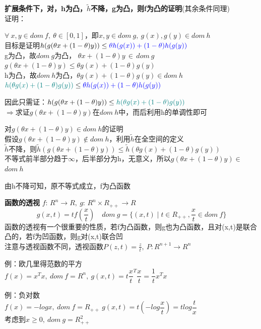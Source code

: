 \documentclass[11pt]{ctexart}         %
\newcommand{\premise}[1][dom\ f]{\forall\ x,y\in #1,\ \theta\in [0,1]}
\newcommand{\linearcombine}[2]{\theta #1+(1-\theta)#2}
\newcommand{\ii}{\,\in\,}
\newcommand{\dom}[1]{$dom\ #1$}
\newcommand{\rl}[2][R]{#1_{#2}} %
\newcommand{\rls}[3][R]{#1_{#2}^{#3}} %
\newcommand{\trans}[1]{#1^T#1} %
\begin{document}
\textbf{扩展条件下，对，h为凸，$\tilde{h}$不降，g为凸，则f为凸的证明}(其余条件同理)\\
证明：
\begin{minipage}[t]{0.9\linewidth}
	\setlength\parskip{12pt}
	$\premise$，即$x,y\in dom\ g,\ g(x),g(y)\in dom\ h$\\
	目标是证明$h(g(\linearcombine{x}{y}))\leq {\color{blue}\theta h(g(x))+(1-\theta)h(g(y))}$\\ [8pt]
	g为凸，故\dom{g}为凸，
	$\linearcombine{x}{y}\ii dom\ g$\\ 
	$g(\linearcombine{x}{y})\leq \linearcombine{g(x)}{g(y)}$\\[8pt]
	h为凸，故\dom{h}为凸，$\linearcombine{g(x)}{g(y)}\in dom\ h$\\
	${\color{teal}h(\linearcombine{g(x)}{g(y)})}\leq {\color{blue}\linearcombine{h(g(x))}{h(g(y))}}$\par
	因此只需证：$h(g(\linearcombine{x}{y}))\leq {\color{teal}h(\linearcombine{g(x)}{g(y)})}$\\
	$\Rightarrow$求证$g(\linearcombine{x}{y})$在\dom{h}中，而后利用h的单调性即可
	
	对$g(\linearcombine{x}{y})\in$\dom{h}的证明\\
	假设$g(\linearcombine{x}{y})\notin$\dom{h}，利用$\tilde{h}$在全空间的定义\\
	$\tilde{h}$不降，则$\tilde{h}(g(\linearcombine{x}{y}))\leq \tilde{h}(\linearcombine{g(x)}{g(y)})$\\
	不等式前半部分趋于$\infty$，后半部分为h，无意义，所以$g(\linearcombine{x}{y})\in$\dom{h}
 
	由h不降可知，原不等式成立，f为凸函数
\end{minipage}

\pagebreak
\textbf{函数的透视}
$f:\,R^n\to R,\ g:\,R^n\times R_{++}\to R$
$$g(x,t)=tf(\frac{x}{t})\quad dom\ g=\{(x,t)\mid t\in R_{++},\frac{x}{t}\in dom\ f\}$$
函数的透视有一个很重要的性质，若f为凸函数，则g也为凸函数，且对(x,t)是联合凸的，若f为凹函数，则g对(x,t)联合凹\\
注意与透视函数不同，透视函数$P(z,t)=\displaystyle\frac{z}{t},\ P:R^{n+1}\to R^n$

例：欧几里得范数的平方\\
$f(x)=x^Tx,\ dom\ f=R^n,\ g(x,t)=t\trans{\dfrac{x}{t}}=\dfrac{1}{t}\trans{x}$

例：负对数\\
$f(x)=-logx,\ dom\ f=\rl{++}\ g(x,t)=t(-log\dfrac{x}{t})=tlog\dfrac{t}{x}$\\
考虑到$x \geq 0,\ dom\ g=\rls{++}{2}$
\end{document}
